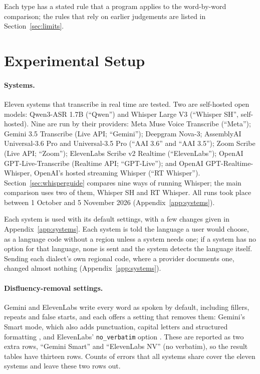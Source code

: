 \documentclass[11pt]{article}
\begin{document}
Each type has a stated rule that a program applies to the word-by-word comparison; the rules that rely on earlier judgements are listed in Section~\ref{sec:limits}.


\FloatBarrier
\section{Experimental Setup}\label{sec:setup}
\paragraph{Systems.} Eleven systems that transcribe in real time are tested. Two are self-hosted open models: Qwen3-ASR 1.7B \citep{qwen3asr} (``Qwen'') and Whisper Large V3 \citep{radford2023whisper} (``Whisper SH'', self-hosted). Nine are run by their providers: Meta Muse Voice Transcribe (``Meta''); Gemini 3.5 Transcribe (Live API; ``Gemini''); Deepgram Nova-3; AssemblyAI Universal-3.6 Pro and Universal-3.5 Pro (``AAI 3.6'' and ``AAI 3.5''); Zoom Scribe (Live API; ``Zoom''); ElevenLabs Scribe v2 Realtime (``ElevenLabs''); OpenAI GPT-Live-Transcribe (Realtime API; ``GPT-Live''); and OpenAI GPT-Realtime-Whisper, OpenAI's hosted streaming Whisper (``RT Whisper''). Section~\ref{sec:whisperguide} compares nine ways of running Whisper; the main comparison uses two of them, Whisper SH and RT Whisper. All runs took place between 1 October and 5 November 2026 (Appendix~\ref{app:systems}).

Each system is used with its default settings, with a few changes given in Appendix~\ref{app:systems}. Each system is told the language a user would choose, as a language code without a region unless a system needs one; if a system has no option for that language, none is sent and the system detects the language itself. Sending each dialect's own regional code, where a provider documents one, changed almost nothing (Appendix~\ref{app:systems}).

\paragraph{Disfluency-removal settings.} Gemini and ElevenLabs write every word as spoken by default, including fillers, repeats and false starts, and each offers a setting that removes them: Gemini's Smart mode, which also adds punctuation, capital letters and structured formatting \citep{geminitranscribedocs}, and ElevenLabs' \texttt{no\_verbatim} option \citep{elevenlabsdocs}. These are reported as two extra rows, ``Gemini Smart'' and ``ElevenLabs NV'' (no verbatim), so the result tables have thirteen rows. Counts of errors that all systems share cover the eleven systems and leave these two rows out.
\end{document}
